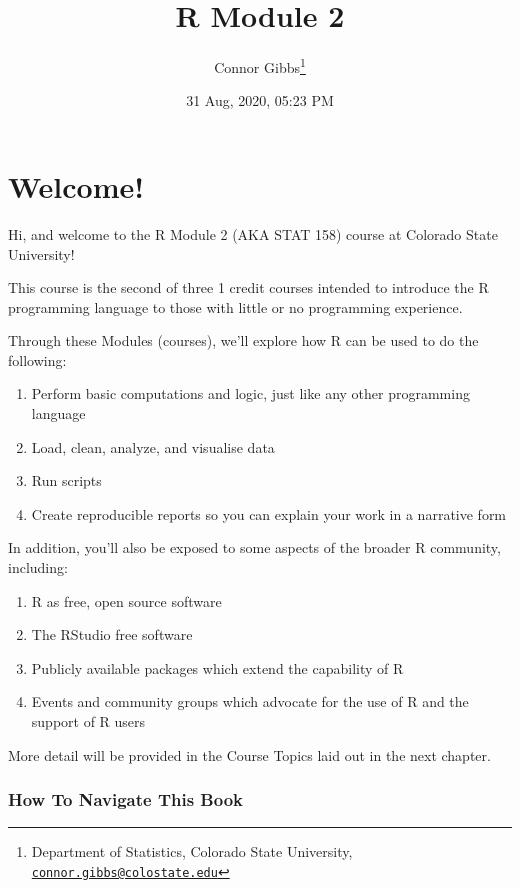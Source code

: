 \documentclass[
]{article}
\title{R Module 2}
\author{Connor Gibbs\footnote{Department of Statistics, Colorado State University, \href{mailto:connor.gibbs@colostate.edu}{\nolinkurl{connor.gibbs@colostate.edu}}}}
\date{31 Aug, 2020, 05:23 PM}
\providecommand{\tightlist}{%
  \setlength{\itemsep}{0pt}\setlength{\parskip}{0pt}}
\begin{document}
\maketitle

{
\setcounter{tocdepth}{2}
\tableofcontents
}
\hypertarget{welcome}{%
\section{Welcome!}\label{welcome}}

Hi, and welcome to the R Module 2 (AKA STAT 158) course at Colorado State University!

This course is the second of three 1 credit courses intended to introduce the R programming language to those with little or no programming experience.

Through these Modules (courses), we'll explore how R can be used to do the following:

\begin{enumerate}
\def\labelenumi{\arabic{enumi}.}
\tightlist
\item
  Perform basic computations and logic, just like any other programming language
\item
  Load, clean, analyze, and visualise data
\item
  Run scripts
\item
  Create reproducible reports so you can explain your work in a narrative form
\end{enumerate}

In addition, you'll also be exposed to some aspects of the broader R community, including:

\begin{enumerate}
\def\labelenumi{\arabic{enumi}.}
\tightlist
\item
  R as free, open source software
\item
  The RStudio free software
\item
  Publicly available packages which extend the capability of R
\item
  Events and community groups which advocate for the use of R and the support of R users
\end{enumerate}

More detail will be provided in the Course Topics laid out in the next chapter.

\hypertarget{how-to-navigate-this-book}{%
\subsubsection{How To Navigate This Book}\label{how-to-navigate-this-book}}
\end{document}
